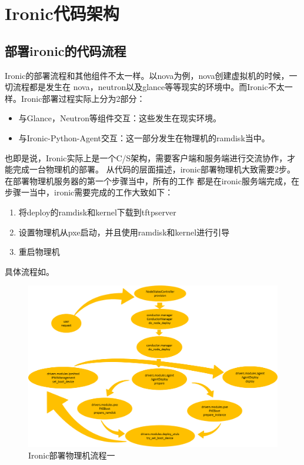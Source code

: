 \chapter{Ironic代码架构}

\section{部署ironic的代码流程}
Ironic的部署流程和其他组件不太一样。以nova为例，nova创建虚拟机的时候，一切流程都是发生在
nova，neutron以及glance等等现实的环境中。而Ironic不太一样。Ironic部署过程实际上分为2部分：
\begin{itemize}
  \item 与Glance，Neutron等组件交互：这些发生在现实环境。
  \item 与Ironic-Python-Agent交互：这一部分发生在物理机的ramdisk当中。
\end{itemize}
也即是说，Ironic实际上是一个C/S架构，需要客户端和服务端进行交流协作，才能完成一台物理机的部署。
从代码的层面描述，ironic部署物理机大致需要2步。在部署物理机服务器的第一个步骤当中，所有的工作
都是在ironic服务端完成，在步骤一当中，ironic需要完成的工作大致如下：
\begin{enumerate}
  \item 将deploy的ramdisk和kernel下载到tftpserver
  \item 设置物理机从pxe启动，并且使用ramdisk和kernel进行引导
  \item 重启物理机
\end{enumerate}

具体流程如。
\begin{figure}[H]
  \centering
  \includegraphics[width=\linewidth]{ironic_workflow1.png}
  \caption{Ironic部署物理机流程一}
  \label{fig:step1}
\end{figure}

